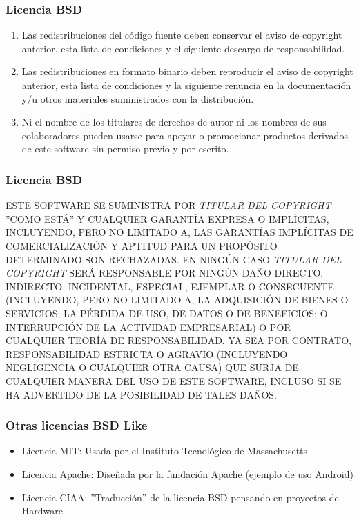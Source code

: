 \documentclass[11pt]{beamer}
\begin{document}
\begin{frame}
\frametitle{Licencia BSD}

\begin{enumerate}
\item Las redistribuciones del código fuente deben conservar el aviso de copyright
   anterior, esta lista de condiciones y el siguiente descargo de responsabilidad.
\pause
\item Las redistribuciones en formato binario deben reproducir el aviso de copyright
   anterior, esta lista de condiciones y la siguiente renuncia en la documentación
   y/u otros materiales suministrados con la distribución.
\pause
\item Ni el nombre de los titulares de derechos de autor ni los nombres de sus
   colaboradores pueden usarse para apoyar o promocionar productos derivados de
   este software sin permiso previo y por escrito.
\end{enumerate}
\end{frame}

\begin{frame}[fragile]
\frametitle{Licencia BSD}
\scriptsize
\begin{block}

ESTE SOFTWARE SE SUMINISTRA POR  \emph{TITULAR DEL COPYRIGHT} ''COMO ESTÁ'' Y CUALQUIER
GARANTÍA EXPRESA O IMPLÍCITAS, INCLUYENDO, PERO NO LIMITADO A, LAS GARANTÍAS
IMPLÍCITAS DE COMERCIALIZACIÓN Y APTITUD PARA UN PROPÓSITO DETERMINADO SON
RECHAZADAS. EN NINGÚN CASO \emph{TITULAR DEL COPYRIGHT} SERÁ RESPONSABLE POR NINGÚN
DAÑO DIRECTO, INDIRECTO, INCIDENTAL, ESPECIAL, EJEMPLAR O CONSECUENTE (INCLUYENDO,
PERO NO LIMITADO A, LA ADQUISICIÓN DE BIENES O SERVICIOS; LA PÉRDIDA DE USO, DE
DATOS O DE BENEFICIOS; O INTERRUPCIÓN DE LA ACTIVIDAD EMPRESARIAL) O POR
CUALQUIER TEORÍA DE RESPONSABILIDAD, YA SEA POR CONTRATO, RESPONSABILIDAD ESTRICTA
O AGRAVIO (INCLUYENDO NEGLIGENCIA O CUALQUIER OTRA CAUSA) QUE SURJA DE CUALQUIER
MANERA DEL USO DE ESTE SOFTWARE, INCLUSO SI SE HA ADVERTIDO DE LA POSIBILIDAD DE
TALES DAÑOS.
\end{block}

\end{frame}

\begin{frame}
\frametitle{Otras licencias BSD Like}

\begin{itemize}[<+->]
\item Licencia MIT: Usada por el Instituto Tecnológico de Massachusetts
\item Licencia Apache: Diseñada por la fundación Apache (ejemplo de uso Android)
\item Licencia CIAA: ''Traducción'' de la licencia BSD pensando en proyectos de Hardware
\end{itemize}
\end{frame}
\end{document}
